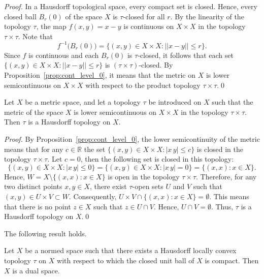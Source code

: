 \documentclass{svproc}
\begin{document}
\begin{proof}

In a Hausdorff topological space, every compact set is closed. Hence, every closed ball $B_r(0)$ of the space $X$ is $\tau$-closed for all $r$. By the linearity of the topology $\tau$, the map $f(x, y) = x - y$ is continuous on $X\times X$ in the topology $\tau\times \tau$. Note that 
$$f^{-1}\bigl(B_r(0)\bigr) = \bigl\{(x, y)\in X\times X\colon ||x - y|| \le r\bigr\}.$$
Since $f$ is continuous and each $B_r(0)$ is $\tau$-closed, it follows that each set $\bigl\{(x, y)\in X\times X\colon ||x - y|| \le r\bigr\}$ is $(\tau\times\tau)$-closed. By Proposition~\ref{prop:cont_level_0}, it means that the metric on $X$ is lower semicontinuous on $X\times X$ with respect to the product topology $\tau\times\tau$.\qed

\end{proof}

\begin{proposition}\label{prop:Haus_top}
Let $X$ be a metric space, and let a topology $\tau$ be introduced on $X$ such that the metric of the space $X$ is lower semicontinuous on $X\times X$ in the topology $\tau\times \tau$. Then $\tau$ is a Hausdorff topology on $X$.
\end{proposition}

\begin{proof}

By Proposition~\ref{prop:cont_level_0}, the lower semicontinuity of the metric means that for any $c\in \mathbb{R}$ the set  
$\bigl\{(x, y)\in X\times X\colon |x\, y|\le c\bigr\}$ is closed in the topology $\tau\times \tau$.  
Let $c = 0$, then the following set is closed in this topology:  
$$\bigl\{(x, y)\in X\times X\colon |x\, y|\le 0\bigr\} = \bigl\{(x, y)\in X\times X\colon |x\, y| = 0\bigr\} = \bigl\{(x, x)\colon x\in X\bigr\}.$$  
Hence, $W = X\setminus \bigl\{(x, x)\colon x\in X\bigr\}$ is open in the topology $\tau\times \tau$.  
Therefore, for any two distinct points $x, y\in X$, there exist $\tau$-open sets $U$ and $V$ such that $(x, y)\in U\times V\subset W$.  
Consequently, $U\times V\cap \bigl\{(x, x)\colon x\in X\bigr\} = \emptyset$. This means that there is no point $z\in X$ such that $z\in U\cap V$. Hence, $U\cap V = \emptyset$.  
Thus, $\tau$ is a Hausdorff topology on $X$.\qed

\end{proof}

The following result holds.

\begin{theorem}\label{thm:Dixmier}
Let $X$ be a normed space such that there exists a Hausdorff locally convex topology $\tau$ on $X$ with respect to which the closed unit ball of $X$ is compact. Then $X$ is a dual space.
\end{theorem}
\end{document}
